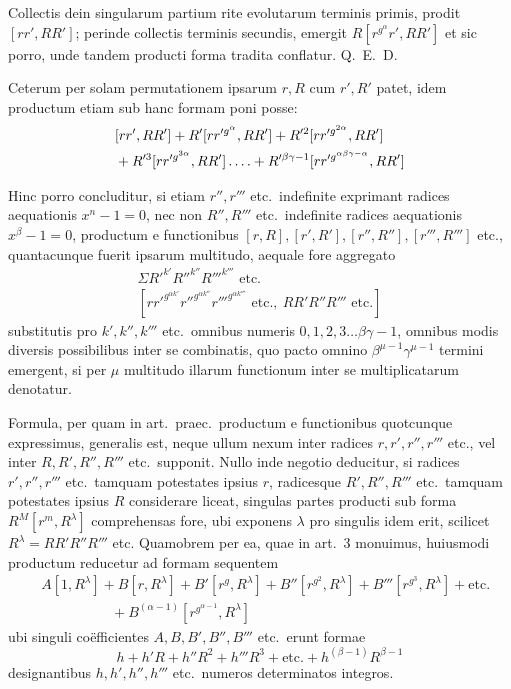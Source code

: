 %
Collectis dein singularum partium rite evolutarum terminis primis, prodit $[rr',RR']$; perinde collectis terminis secundis, emergit $R[r^{g^\alpha}r',RR']$ et sic porro, unde tandem producti forma tradita conflatur. Q.\ E.\ D.

Ceterum per solam permutationem ipsarum $r,R$ cum $r',R'$ patet, idem productum etiam sub hanc formam poni posse:
\[
\begin{aligned}
&[rr',RR']+R'[rr'^{g^\alpha},RR']+R'^2[rr'^{g^{2\alpha}},RR']\\
&{}+R'^3[rr'^{g^{3\alpha}},RR']\mathinner{.\,.\,.\,.}+R'^{\beta\gamma-1}[rr'^{g^{\alpha\beta\gamma-\alpha}},RR']
\end{aligned}
\]

Hinc porro concluditur, si etiam $r'',r'''$ etc.\ indefinite exprimant radices aequationis $x^n-1=0$, nec non $R'',R'''$ etc.\ indefinite radices aequationis $x^\beta-1=0$, productum e functionibus $[r,R],[r',R'],[r'',R''],[r''',R''']$ etc., quantacunque fuerit ipsarum multitudo, aequale fore aggregato
\[
\begin{gathered}
\Sigma R'^{k'}R''^{k''}R'''^{k'''}\text{ etc.}\\
{}[rr'^{g^{\alpha k'}}r''^{g^{\alpha k''}}r'''^{g^{\alpha k'''}}\text{ etc.},\ RR'R''R'''\text{ etc.}]
\end{gathered}
\]
substitutis pro $k',k'',k'''$ etc.\ omnibus numeris $0,1,2,3\ldots\beta\gamma-1$, omnibus modis diversis possibilibus inter se combinatis, quo pacto omnino $\beta^{\mu-1}\gamma^{\mu-1}$ termini emergent, si per $\mu$ multitudo illarum functionum inter se multiplicatarum denotatur.

Formula, per quam in art.\ praec.\ productum e functionibus quotcunque expressimus, generalis est, neque ullum nexum inter radices $r,r',r'',r'''$ etc., vel inter $R,R',R'',R'''$ etc.\ supponit. Nullo inde negotio deducitur, si radices $r',r'',r'''$ etc.\ tamquam potestates ipsius $r$, radicesque $R',R'',R'''$ etc.\ tamquam potestates ipsius $R$ considerare liceat, singulas partes producti sub forma $R^M[r^m,R^\lambda]$ comprehensas fore, ubi exponens $\lambda$ pro singulis idem erit, scilicet $R^\lambda=RR'R''R'''$ etc. Quamobrem per ea, quae in art.\ 3 monuimus, huiusmodi productum reducetur ad formam sequentem
\[
\begin{aligned}
&A[1,R^\lambda]+B[r,R^\lambda]+B'[r^g,R^\lambda]+B''[r^{g^2},R^\lambda]+B'''[r^{g^3},R^\lambda]+\text{etc.}\\
&\hspace{5em}{}+B^{(\alpha-1)}[r^{g^{\alpha-1}},R^\lambda]
\end{aligned}
\]
ubi singuli coëfficientes $A,B,B',B'',B'''$ etc.\ erunt formae
\[
h+h'R+h''R^2+h'''R^3+\text{etc.}+h^{(\beta-1)}R^{\beta-1}
\]
designantibus $h,h',h'',h'''$ etc.\ numeros determinatos integros.

